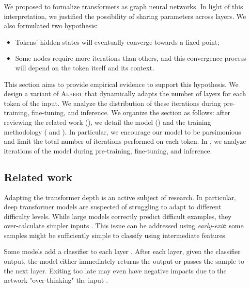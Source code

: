 We proposed to formalize transformers as graph neural networks. In light of this interpretation, we justified the possibility of sharing parameters across layers. We also formulated two hypothesis: 
\begin{itemize}
    \item Tokens’ hidden states will eventually converge towards a fixed point;
    \item Some nodes require more iterations than others, and this convergence process will depend on the token itself and its context.
\end{itemize}
This section aims to provide empirical evidence to support this hypothesis. We design a variant of \textsc{Albert} that dynamically adapts the number of layers for each token of the input. We analyze the distribution of these iterations during pre-training, fine-tuning, and inference. We organize the section as follows: after reviewing the related work (), we detail the model () and the training methodology ( and ). In particular, we encourage our model to be parsimonious and limit the total number of iterations performed on each token. In , we analyze iterations of the model during pre-training, fine-tuning, and inference.

\subsection{Related work}

Adapting the transformer depth is an active subject of research. In particular, deep transformer models are suspected of struggling to adapt to different difficulty levels. While large models correctly predict difficult examples, they over-calculate simpler inputs \parencite{liu_20}. This issue can be addressed using \textit{early-exit}: some samples might be sufficiently simple to classify using intermediate features. %

Some models add a classifier to each layer \parencite{zhou_20b, liu_20, xin_20}. After each layer, given the classifier output, the model either immediately returns the output or passes the sample to the next layer. 
Exiting too late may even have negative impacts due to the network "over-thinking" the input \parencite{kaya_19}. 

